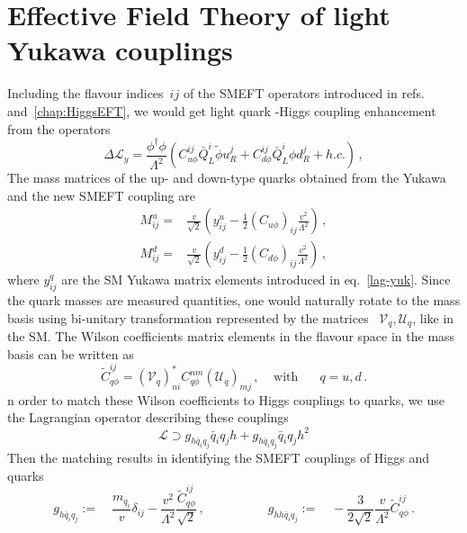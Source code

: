 \section{Effective Field Theory of light Yukawa couplings\label{sec:EFTlightyuk}}
Including the flavour indices~$ij$ of the SMEFT operators introduced in refs.~\cite{Grzadkowski:2010es,Contino:2013kra} and~\autoref{chap:HiggsEFT}, we would get light quark -Higgs coupling enhancement from the operators
\begin{equation}
	\Delta \mathcal{L}_{y}=\frac{\phi^{\dagger}\phi}{\Lambda^2}\left( C_{u \phi}^{ij} \bar{Q}_L^i \tilde{\phi} u_R^j + C_{d \phi}^{ij} \bar{Q}_L^i \phi d_R^j +h.c.\right)\,,
	\label{eq:EFTop}
\end{equation}
  The mass matrices of the up- and down-type quarks obtained from the Yukawa and the new SMEFT coupling are
 \begin{align}
 	M^u_{ij} =& \frac{v}{\sqrt{2}} \left( y^u_{ij}-\frac{1}{2} (C_{u\phi})_{ij}\frac{v^2}{\Lambda^2}\right)\,,\nonumber\\
 	M^d_{ij} =& \frac{v}{\sqrt{2}} \left( y^d_{ij}-\frac{1}{2} (C_{d\phi})_{ij}\frac{v^2}{\Lambda^2}\right)\,, \label{eq:mass}
 \end{align}
where $y^q_{ij}$ are the SM Yukawa matrix elements introduced in eq.~\eqref{lag-yuk}. Since the quark masses are measured quantities, one would naturally rotate to the mass basis using bi-unitary transformation represented by the matrices ~$ \mathcal{V}_q, \mathcal{U}_q$, like in the SM. The Wilson coefficients matrix elements in the flavour space in the mass basis can be written as
\begin{equation}
	\tilde{C}_{q \phi}^{ij}= \left(\mathcal{V}_{q}\right)^*_{ni}C^{nm}_{q\phi}\left( \mathcal U_{q}\right)_{mj}\, , \; \; \; \;  \text{with } \;\;\;\;\; q = u,d\, .
\end{equation}
n order to match these Wilson coefficients to Higgs couplings to quarks, we use the Lagrangian operator describing these couplings
\begin{equation}
	\mathcal{L}\supset g_{h\bar{q}_i q_j}\bar{q}_i q_j h + g_{h\bar{q}_i q_j}\bar{q}_i q_j h^2
\end{equation}
Then the matching results in identifying the SMEFT couplings of Higgs and quarks
\begin{equation}
	g_{h\bar{q}_i q_j} := \quad \frac{m_{q_i}}{v}\delta_{ij}-\frac{v^2}{\Lambda^2} \frac{	\tilde{C}_{q \phi}^{ij}}{\sqrt{2}}\,, \quad \quad \quad \quad \quad g_{h h\bar{q}_i q_j} := \quad -\frac{3}{2\sqrt{2}}\frac{v}{\Lambda^2}	\tilde{C}_{q \phi}^{ij}\,. \label{eq:couplingsEFT}
\end{equation}
